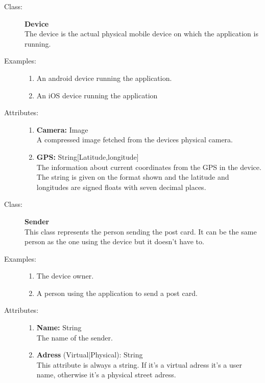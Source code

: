\documentclass[10pt,a4paper]{article}
\begin{document}
\hrulefill

\begin{description}
\item[Class:] \textbf{Device} \hfill \\
The device is the actual physical mobile device on which the application is running.

\item[Examples:] \hfill
\begin{enumerate}
\item An android device running the application.
\item An iOS device running the application
\end{enumerate}

\item[Attributes:] \hfill
\begin{enumerate}
\item \textbf{Camera:} Image \hfill \\A compressed image fetched from the devices physical camera.
\item \textbf{GPS:} String[Latitude,longitude] \hfill \\The information about current coordinates from the GPS in the device. The string is given on the format shown and the latitude and longitudes are signed floats with seven decimal places.
\end{enumerate}
\end{description}

\hrulefill

\begin{description}
\item[Class:] \textbf{Sender} \hfill \\
This class represents the person sending the post card. It can be the same person as the one using the device but it doesn't have to.

\item[Examples:] \hfill
\begin{enumerate}
\item The device owner.
\item A person using the application to send a post card.
\end{enumerate}

\item[Attributes:] \hfill
\begin{enumerate}
\item \textbf{Name:} String \hfill \\The name of the sender. 
\item \textbf{Adress} (Virtual|Physical): String \hfill \\This attribute is always a string. If it's a virtual adress it's a user name, otherwise it's a physical street adress. 
\end{enumerate}
\end{description}
\end{document}
